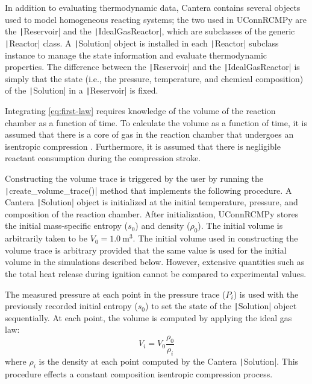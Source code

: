 \documentclass[12pt]{../ussci}
\begin{document}
In addition to evaluating thermodynamic data, Cantera \autocite{cantera}
contains several objects used to model homogeneous reacting systems; the
two used in UConnRCMPy are the \texttt|Reservoir| and the
\texttt|IdealGasReactor|, which are subclasses of the generic
\texttt|Reactor| class. A \texttt|Solution| object is installed in each
\texttt|Reactor| subclass instance to manage the state information and
evaluate thermodynamic properties. The difference between the
\texttt|Reservoir| and the \texttt|IdealGasReactor| is simply that the
state (i.e., the pressure, temperature, and chemical composition) of the
\texttt|Solution| in a \texttt|Reservoir| is fixed.

Integrating \cref{eq:first-law} requires knowledge of the
volume of the reaction chamber as a function of time. To calculate the
volume as a function of time, it is assumed that there is a core of gas
in the reaction chamber that undergoes an isentropic compression
\autocite{Lee1998}. Furthermore, it is assumed that there is negligible
reactant consumption during the compression stroke.

Constructing the volume trace is triggered by the user by running the
\texttt|create_volume_trace()| method that implements the following
procedure. A Cantera \texttt|Solution| object is initialized at the
initial temperature, pressure, and composition of the reaction chamber.
After initialization, UConnRCMPy stores the initial mass-specific
entropy (\(s_0\)) and density (\(\rho_0\)). The initial volume is
arbitrarily taken to be \(V_0=\SI{1.0}{\m\cubed}\). The initial volume used
in constructing the volume trace is arbitrary provided that the same
value is used for the initial volume in the simulations described below.
However, extensive quantities such as the total heat release during
ignition cannot be compared to experimental values.

The measured pressure at each point in the pressure trace (\(P_i\)) is
used with the previously recorded initial entropy (\(s_0\)) to set the
state of the \texttt|Solution| object sequentially. At each point, the
volume is computed by applying the ideal gas law:
%
\begin{equation}
 V_i = V_0 \frac{\rho_0}{\rho_i}
\end{equation}
%
where \(\rho_i\) is the density at each point computed by the Cantera
\texttt|Solution|. This procedure effects a constant composition
isentropic compression process.
\end{document}
